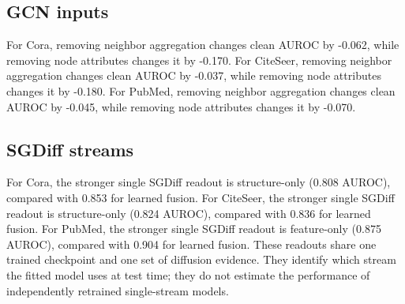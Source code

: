 \subsection{GCN inputs}
For Cora, removing neighbor aggregation changes clean AUROC by -0.062, while removing node attributes changes it by -0.170.
For CiteSeer, removing neighbor aggregation changes clean AUROC by -0.037, while removing node attributes changes it by -0.180.
For PubMed, removing neighbor aggregation changes clean AUROC by -0.045, while removing node attributes changes it by -0.070.

\subsection{SGDiff streams}
For Cora, the stronger single SGDiff readout is structure-only (0.808 AUROC), compared with 0.853 for learned fusion.
For CiteSeer, the stronger single SGDiff readout is structure-only (0.824 AUROC), compared with 0.836 for learned fusion.
For PubMed, the stronger single SGDiff readout is feature-only (0.875 AUROC), compared with 0.904 for learned fusion.
These readouts share one trained checkpoint and one set of diffusion evidence. They identify which stream the fitted model uses at test time; they do not estimate the performance of independently retrained single-stream models.
